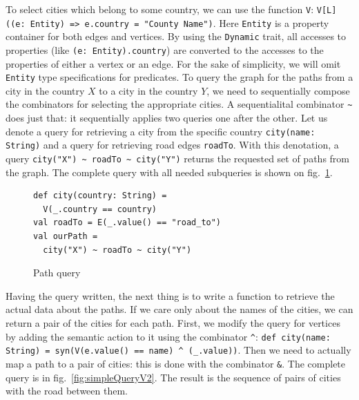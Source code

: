 To select cities which belong to some country, we can use the function \lstinline{V}: \lstinline{V[L]((e: Entity) => e.country = "County Name")}.
Here \lstinline{Entity} is a property container for both edges and vertices. 
By using the \lstinline{Dynamic} trait, all accesses to properties (like \lstinline{(e: Entity).country}) are converted to the accesses to the properties of either a vertex or an edge.
For the sake of simplicity, we will omit \lstinline{Entity} type specifications for predicates. 
To query the graph for the paths from a city in the country $X$ to a city in the country $Y$, we need to sequentially compose the combinators for selecting the appropriate cities. 
A sequentialital combinator \lstinline{~} does just that: it sequentially  applies two queries one after the other. 
Let us denote a query for retrieving a city from the specific country \lstinline{city(name: String)} and a query for retrieving road edges \lstinline{roadTo}. 
With this denotation, a query \lstinline{city("X") ~ roadTo ~ city("Y")} returns the requested set of paths from the graph.
The complete query with all needed subqueries is shown on fig.~\ref{fig:simpleQuery}.

\begin{figure}[h]
\begin{lstlisting}
def city(country: String) =
  V(_.country == country)
val roadTo = E(_.value() == "road_to")
val ourPath = 
  city("X") ~ roadTo ~ city("Y")
\end{lstlisting}
\caption{Path query}
\label{fig:simpleQuery}
\end{figure}

Having the query written, the next thing is to write a function to retrieve the actual data about the paths.
If we care only about the names of the cities, we can return a pair of the cities for each path.
First, we modify the query for vertices by adding the semantic action to it using the combinator \lstinline{^}: \lstinline{def city(name: String) = syn(V(e.value() == name) ^ (_.value))}.
Then we need to actually map a path to a pair of cities: this is done with the combinator \lstinline{&}.
The complete query is in fig.~\ref{fig:simpleQueryV2}.
The result is the sequence of pairs of cities with the road between them.


